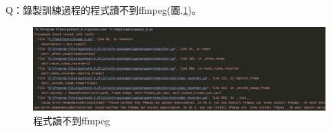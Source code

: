 \documentclass[14pt,a4paper]{report}  %
\begin{document}
\hspace{-1.7em} Q：錄製訓練過程的程式讀不到ffmpeg(圖.\ref{fig.Q_ffmpeg})。\\
\begin{figure}[hbt!]
\begin{center}
\includegraphics[width=15cm]{Q_ffmpeg}
\caption{\Large 程式讀不到ffmpeg}
\label{fig.Q_ffmpeg}
\end{center}
\end{figure}
\end{document}
